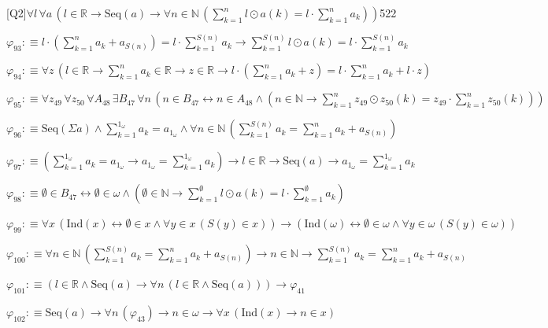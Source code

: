 \begin{fullproof}{[Q2]}{$\forall l\,\forall a\,(l \in \mathbb{R} \to \mathrm{Seq}(a) \to \forall n \in \mathbb{N}\,({\textstyle\sum_{k=1}^{n} l \odot a(k)} = l \cdot {\textstyle\sum_{k=1}^{n} a_{k}}))$}{522}
\begin{abbrevlist}
\item $\varphi_{93} :\equiv l \cdot ({\textstyle\sum_{k=1}^{n} a_{k}} + a_{S(n)}) = l \cdot {\textstyle\sum_{k=1}^{S(n)} a_{k}} \to {\textstyle\sum_{k=1}^{S(n)} l \odot a(k)} = l \cdot {\textstyle\sum_{k=1}^{S(n)} a_{k}}$
\item $\varphi_{94} :\equiv \forall z\,(l \in \mathbb{R} \to {\textstyle\sum_{k=1}^{n} a_{k}} \in \mathbb{R} \to z \in \mathbb{R} \to l \cdot ({\textstyle\sum_{k=1}^{n} a_{k}} + z) = l \cdot {\textstyle\sum_{k=1}^{n} a_{k}} + l \cdot z)$
\item $\varphi_{95} :\equiv \forall z_{49}\,\forall z_{50}\,\forall A_{48}\,\exists B_{47}\,\forall n\,(n \in B_{47} \leftrightarrow n \in A_{48} \land (n \in \mathbb{N} \to {\textstyle\sum_{k=1}^{n} z_{49} \odot z_{50}(k)} = z_{49} \cdot {\textstyle\sum_{k=1}^{n} z_{50}(k)}))$
\item $\varphi_{96} :\equiv \mathrm{Seq}(\Sigma a) \land {\textstyle\sum_{k=1}^{1_{\omega}} a_{k}} = a_{1_{\omega}} \land \forall n \in \mathbb{N}\,({\textstyle\sum_{k=1}^{S(n)} a_{k}} = {\textstyle\sum_{k=1}^{n} a_{k}} + a_{S(n)})$
\item $\varphi_{97} :\equiv ({\textstyle\sum_{k=1}^{1_{\omega}} a_{k}} = a_{1_{\omega}} \to a_{1_{\omega}} = {\textstyle\sum_{k=1}^{1_{\omega}} a_{k}}) \to l \in \mathbb{R} \to \mathrm{Seq}(a) \to a_{1_{\omega}} = {\textstyle\sum_{k=1}^{1_{\omega}} a_{k}}$
\item $\varphi_{98} :\equiv \emptyset \in B_{47} \leftrightarrow \emptyset \in \omega \land (\emptyset \in \mathbb{N} \to {\textstyle\sum_{k=1}^{\emptyset} l \odot a(k)} = l \cdot {\textstyle\sum_{k=1}^{\emptyset} a_{k}})$
\item $\varphi_{99} :\equiv \forall x\,(\mathrm{Ind}(x) \leftrightarrow \emptyset \in x \land \forall y \in x\,(S(y) \in x)) \to (\mathrm{Ind}(\omega) \leftrightarrow \emptyset \in \omega \land \forall y \in \omega\,(S(y) \in \omega))$
\item $\varphi_{100} :\equiv \forall n \in \mathbb{N}\,({\textstyle\sum_{k=1}^{S(n)} a_{k}} = {\textstyle\sum_{k=1}^{n} a_{k}} + a_{S(n)}) \to n \in \mathbb{N} \to {\textstyle\sum_{k=1}^{S(n)} a_{k}} = {\textstyle\sum_{k=1}^{n} a_{k}} + a_{S(n)}$
\item $\varphi_{101} :\equiv (l \in \mathbb{R} \land \mathrm{Seq}(a) \to \forall n\,(l \in \mathbb{R} \land \mathrm{Seq}(a))) \to \varphi_{41}$
\item $\varphi_{102} :\equiv \mathrm{Seq}(a) \to \forall n\,(\varphi_{43}) \to n \in \omega \to \forall x\,(\mathrm{Ind}(x) \to n \in x)$

\end{abbrevlist}
\end{fullproof}
